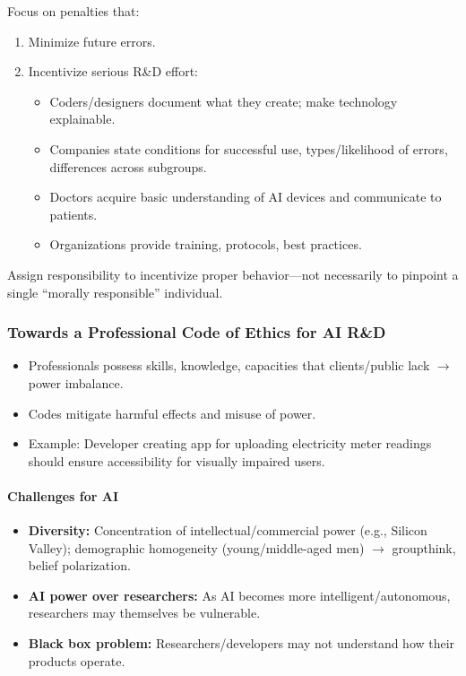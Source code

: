 \begin{thmbox}
Focus on penalties that:
\begin{enumerate}
  \item Minimize future errors.
  \item Incentivize serious R\&D effort:
  \begin{itemize}
    \item Coders/designers document what they create; make technology explainable.
    \item Companies state conditions for successful use, types/likelihood of errors, differences across subgroups.
    \item Doctors acquire basic understanding of AI devices and communicate to patients.
    \item Organizations provide training, protocols, best practices.
  \end{itemize}
\end{enumerate}
Assign responsibility to incentivize proper behavior---not necessarily to pinpoint a single ``morally responsible'' individual.
\end{thmbox}

\bigseparator

\subsubsection{Towards a Professional Code of Ethics for AI R\&D}

\begin{keybox}
\begin{itemize}
  \item Professionals possess skills, knowledge, capacities that clients/public lack $\to$ power imbalance.
  \item Codes mitigate harmful effects and misuse of power.
  \item Example: Developer creating app for uploading electricity meter readings should ensure accessibility for visually impaired users.
\end{itemize}
\end{keybox}

\paragraph*{Challenges for AI}

\begin{itemize}
  \item \textbf{Diversity:} Concentration of intellectual/commercial power (e.g., Silicon Valley); demographic homogeneity (young/middle-aged men) $\to$ groupthink, belief polarization.
  \item \textbf{AI power over researchers:} As AI becomes more intelligent/autonomous, researchers may themselves be vulnerable.
  \item \textbf{Black box problem:} Researchers/developers may not understand how their products operate.
\end{itemize}


